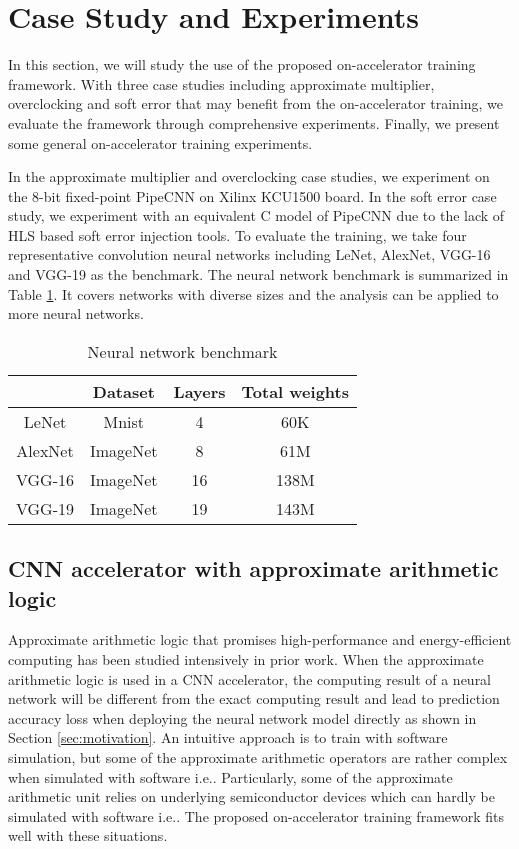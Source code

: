 \section{Case Study and Experiments} \label{sec:casestudy}
In this section, we will study the use of the proposed on-accelerator training 
framework. With three case studies including approximate multiplier, 
overclocking and soft error that may benefit from the on-accelerator training, 
we evaluate the framework through comprehensive experiments. Finally, we present 
some general on-accelerator training experiments.

In the approximate multiplier and overclocking case studies, we experiment on the 8-bit 
fixed-point PipeCNN \cite{pipecnn_2} on Xilinx KCU1500 board. In the soft error case study, 
we experiment with an equivalent C model of PipeCNN due to the lack of 
HLS based soft error injection tools. To evaluate the training, 
we take four representative convolution neural networks including LeNet, 
AlexNet, VGG-16 and VGG-19 as the benchmark. The neural network 
benchmark is summarized in Table \ref{tab:CNN-table}. It covers networks with 
diverse sizes and the analysis can be applied to more neural networks.
\begin{table}[h]
        \centering
        \vspace{-0.3em}
        \caption{Neural network benchmark}
        \label{tab:CNN-table}
        \vspace{-0.3em}
        \begin{tabular}{c|c|c|c}
		\toprule
		  & Dataset & Layers & Total weights \\
		\midrule
		LeNet & Mnist & 4 & 60K \\
		\midrule
		AlexNet & ImageNet & 8 & 61M \\
		\midrule
		VGG-16 & ImageNet & 16 & 138M \\
		\midrule
		VGG-19 & ImageNet & 19 & 143M \\
		\bottomrule
        \end{tabular}
        \vspace{-1em}
\end{table}


\subsection{CNN accelerator with approximate arithmetic logic}
Approximate arithmetic logic that promises high-performance and energy-efficient computing has 
been studied intensively in prior work\cite{Miao_40,han_41}. When the approximate arithmetic logic 
is used in a CNN accelerator, the computing result of a neural network will be different 
from the exact computing result and lead to prediction accuracy loss when deploying 
the neural network model directly as shown in Section \ref{sec:motivation}. 
An intuitive approach is to train with software simulation, but some of the approximate arithmetic 
operators are rather complex when simulated with software i.e.\cite{appro_45}. Particularly, some of the 
approximate arithmetic unit relies on underlying semiconductor devices which 
can hardly be simulated with software i.e.\cite{appro_46}. The proposed on-accelerator 
training framework fits well with these situations. 

